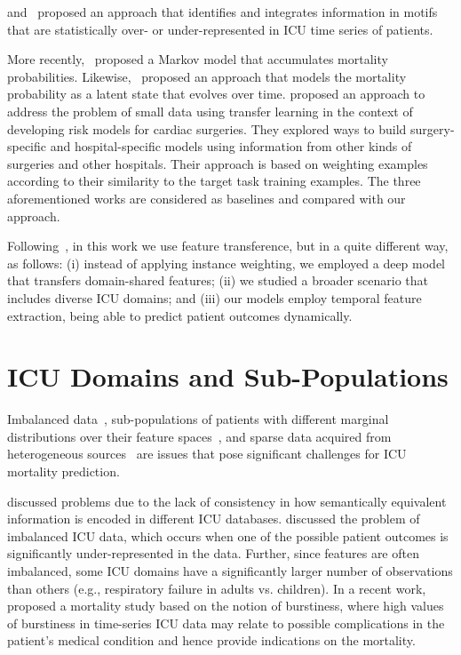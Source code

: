 and~\citet{mcmillan} proposed an approach that identifies and integrates information in motifs that are statistically over- or under-represented in ICU time series of patients. 

More recently,~\citet{hyun} proposed a Markov model that accumulates mortality probabilities. Likewise,~\citet{time-series} proposed an approach that models the mortality probability as a latent state that evolves over time. \citet{kdd2} proposed an approach to address the problem of small data using transfer learning in the context of developing risk models for cardiac surgeries. They explored ways to build surgery-specific and hospital-specific models using information from other kinds of surgeries and other hospitals. Their approach is based on weighting examples according to their similarity to the target task training examples. The three aforementioned works are considered as baselines and compared with our approach.

Following~\citet{kdd2}, in this work we use feature transference, but in a quite different way, as follows: (i) instead of applying instance weighting, we employed a deep model that transfers domain-shared features; (ii) we studied a broader scenario that includes diverse ICU domains; and (iii) our models employ temporal feature extraction, being able to predict patient outcomes dynamically.

\section{ICU Domains and Sub-Populations}

Imbalanced data~\citep{imbalance}, sub-populations of patients with different marginal distributions over their feature spaces~\citep{nori}, and sparse data acquired from heterogeneous sources~\citep{szolovits2,het} are issues that pose significant challenges for ICU mortality prediction. 

\citet{gong} discussed problems due to the lack of consistency in how semantically equivalent information is encoded in different ICU databases. \citet{imbalance} discussed the problem of imbalanced ICU data, which occurs when one of the possible patient outcomes is significantly under-represented in the data. Further, since features are often imbalanced, some ICU domains have a significantly larger number of observations than others (e.g., respiratory failure in adults vs. children). In a recent work,~\citet{icde} proposed a mortality study based on the notion of burstiness, where high values of burstiness in time-series ICU data may relate to possible complications in the patient's medical condition and hence provide indications on the mortality.

